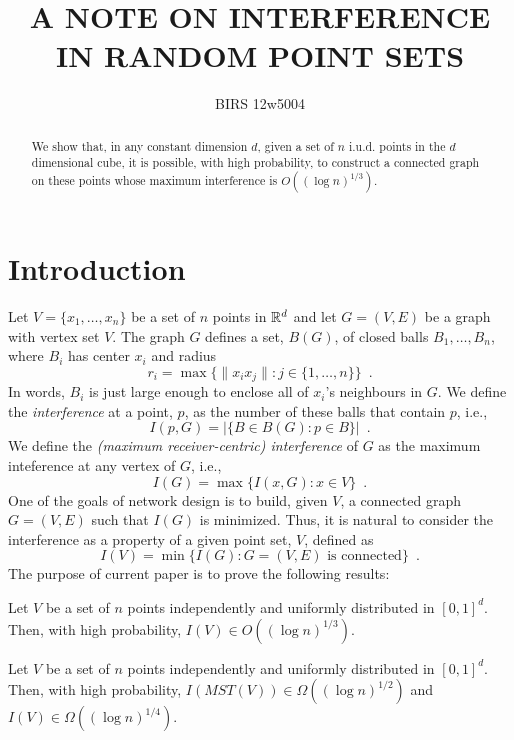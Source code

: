 \documentclass{patmorin}
\title{\MakeTextUppercase{A Note on Interference in Random Point Sets}}
\author{BIRS 12w5004}
\newcommand{\mst}{\mathit{MST}}
\begin{document}
\maketitle

\begin{abstract}
  We show that, in any constant dimension $d$, given a set of $n$
  i.u.d. points in the $d$ dimensional cube, it is possible, with high
  probability, to construct a connected graph on these points whose
  maximum interference is $O((\log n)^{1/3})$.
\end{abstract}

\section{Introduction}


Let $V=\{x_1,\ldots,x_n\}$ be a set of $n$ points in $\mathbb{R}^d$ and let
$G=(V,E)$ be a graph with vertex set $V$.  The graph $G$ defines a set,
$B(G)$, of closed balls $B_1,\ldots,B_n$, where $B_i$ has center $x_i$
and radius
\[
   r_i = \max\{\|x_ix_j\| : j\in\{1,\ldots,n\}\} \enspace .
\]
In words, $B_i$ is just large enough to enclose all of $x_i$'s neighbours
in $G$.  We define the \emph{interference} at a point, $p$, as the
number of
these balls that contain $p$, i.e.,
\[
    I(p,G) = |\{B\in B(G) : p\in B\}| \enspace .
\]
We define the \emph{(maximum receiver-centric) interference} of $G$ as the
maximum inteference at any vertex of $G$, i.e.,
\[
   I(G) = \max\{I(x,G) : x\in V\} \enspace .
\]
One of the goals of network design is to build, given $V$, a connected
graph $G=(V,E)$ such that $I(G)$ is minimized.  Thus, it is natural to consider the interference as a property of a given point set, $V$, defined as
\[
  I(V) = \min\{I(G) : \mbox{$G=(V,E)$ is connected}\} \enspace .
\]
The purpose of current paper is to prove the following results:
\begin{thm}
  Let $V$ be a set of $n$ points independently and uniformly distributed
  in $[0,1]^d$.  Then, with high probability, $I(V)\in O((\log n)^{1/3})$.
\end{thm}

\begin{thm}
  Let $V$ be a set of $n$ points independently and uniformly distributed
  in $[0,1]^d$.  Then, with high probability, $I(\mst(V))\in\Omega((\log
  n)^{1/2})$ and $I(V)\in \Omega((\log n)^{1/4})$.
\end{thm}
\end{document}
